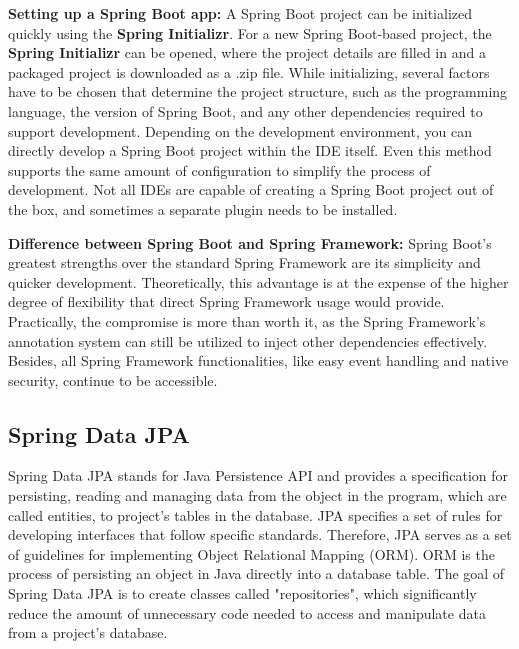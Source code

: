     \textbf{Setting up a Spring Boot app:} \newline
    A Spring Boot project can be initialized quickly using the \textbf{Spring Initializr}. For a new Spring Boot-based project, the \textbf{Spring Initializr} can be opened, where the project details are filled in and a packaged project is downloaded as a .zip file. While initializing, several factors have to be chosen that determine the project structure, such as the programming language, the version of Spring Boot, and any other dependencies required to support development. \newline
    Depending on the development environment, you can directly develop a Spring Boot project within the IDE itself. Even this method supports the same amount of configuration to simplify the process of development. Not all IDEs are capable of creating a Spring Boot project out of the box, and sometimes a separate plugin needs to be installed.\Autocite{Andi:SpringInit}
    
    \textbf{Difference between Spring Boot and Spring Framework:} \newline
    Spring Boot's greatest strengths over the standard Spring Framework are its simplicity and quicker development. Theoretically, this advantage is at the expense of the higher degree of flexibility that direct Spring Framework usage would provide. Practically, the compromise is more than  worth it, as the Spring Framework's annotation system can still be utilized to inject other dependencies effectively. Besides, all Spring Framework functionalities, like easy event handling and native security, continue to be accessible. \Autocite{Andi:SpringBoot2}
    
    \subsection{Spring Data JPA}
    Spring Data JPA stands for Java Persistence API and provides a specification for persisting, reading and managing data from the object in the program, which are called entities, to project's tables in the database. JPA specifies a set of rules for developing interfaces that follow specific standards. Therefore, JPA serves as a set of guidelines for implementing Object Relational Mapping (ORM). 
    ORM is the process of persisting an object in Java directly into a database table. \newline
    The goal of Spring Data JPA is to create classes called "repositories", which significantly reduce the amount of unnecessary code needed to access and manipulate data from a project's database. \newline 

